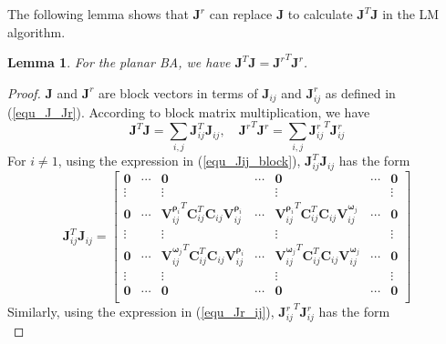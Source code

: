 \documentclass{vgtc}                          %
\newtheorem{lemma}{Lemma}
\begin{document}
The following lemma shows that  $	\mathbf{J}^{r} $ can replace 	$\mathbf{J} $ to calculate $\mathbf{J}^{T}\mathbf{J}$  in the  LM algorithm.
\begin{lemma} \label{lemma_JJ}
	For the planar BA, we have $\mathbf{J}^{T}\mathbf{J} = {\mathbf{J}^{r}}^{T}\mathbf{J}^{r}$.
\end{lemma}
\begin{proof}
	$\mathbf{J}$ and $\mathbf{J}^r$ are block vectors in terms of  $\mathbf{J}_{ij}$ and $\mathbf{J}_{ij}^r$ as defined in (\ref{equ_J_Jr}). According to block matrix multiplication, we have
	\begin{equation} \label{equ_sum_JTJ}
		\mathbf{J}^{T}\mathbf{J}  = \sum_{i,j}\mathbf{J}_{ij}^{T}\mathbf{J}_{ij}, \quad {\mathbf{J}^{r}}^{T}\mathbf{J}^{r}  = \sum_{i,j}{\mathbf{J}_{ij}^{r}}^{T}\mathbf{J}_{ij}^{r}
	\end{equation}
	For $i \neq 1$, using the expression in (\ref{equ_Jij_block}), $\mathbf{J}_{ij}^{T}\mathbf{J}_{ij}$ has the form
	\begin{equation} \label{equ_JTJ}
		\mathbf{J}_{ij}^{T}\mathbf{J}_{ij} = \begin{bmatrix}
			\mathbf{0} & \cdots  & 	\mathbf{0} & \cdots & \mathbf{0} & \cdots & \mathbf{0} \\
			\vdots        &  &  \vdots &  & \vdots &  & \vdots \\
			\mathbf{0} & \cdots  & 	 {\bm{V}^{{\bm{\rho}}_{i}}_{ij}}^{T}\mathbf{C}_{ij}^{T}\mathbf{C}_{ij}\bm{V}^{{\bm{\rho}}_{i}}_{ij} & \cdots &  {\bm{V}^{{\bm{\rho}}_{i}}_{ij}}^{T}\mathbf{C}_{ij}^{T}\mathbf{C}_{ij}\bm{V}^{{\bm{\omega}}_{j}}_{ij} & \cdots & \mathbf{0} \\
			\vdots        &   &  \vdots &  & \vdots &  & \vdots \\
			\mathbf{0} & \cdots  & 	 {\bm{V}^{{\bm{\omega}}_{j}}_{ij}}^{T}\mathbf{C}_{ij}^{T}\mathbf{C}_{ij}\bm{V}^{{\bm{\rho}}_{i}}_{ij} & \cdots &  {\bm{V}^{{\bm{\omega}}_{j}}_{ij}}^{T}\mathbf{C}_{ij}^{T}\mathbf{C}_{ij}\bm{V}^{{\bm{\omega}}_{j}}_{ij} & \cdots & \mathbf{0} \\
			\vdots        &   &  \vdots &  & \vdots &  & \vdots \\
			\mathbf{0} & \cdots  & 	\mathbf{0} & \cdots & \mathbf{0} & \cdots & \mathbf{0} \\
		\end{bmatrix}
	\end{equation}
	Similarly, using the expression in (\ref{equ_Jr_ij}), ${\mathbf{J}_{ij}^{r}}^{T}\mathbf{J}_{ij}^{r}$ has the form
	\begin{equation} \label{equ_JrTJr}

\end{equation}
\end{proof}
\end{document}
